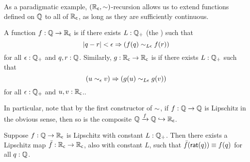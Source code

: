 As a paradigmatic example, $(\mathbb{R}_\mathsf{c},\mathord\sim)$-recursion allows us to extend functions defined on $\mathbb{Q}$ to all of $\mathbb{R}_\mathsf{c}$, as long as they are sufficiently continuous.

\begin{defn}\label{defn:lipschitz}
  A function $f:\mathbb{Q}\to\mathbb{R}_\mathsf{c}$ is  if there exists $L:\mathbb{Q}_{+}$ (the ) such that
  \[ |q - r|<\epsilon \Rightarrow (f(q) \sim_{L\epsilon} f(r)) \]
  for all $\epsilon:\mathbb{Q}_{+}$ and $q,r:\mathbb{Q}$.
  Similarly, $g:\mathbb{R}_\mathsf{c}\to\mathbb{R}_\mathsf{c}$ is  if there exists $L:\mathbb{Q}_{+}$ such that
  \[ (u\sim_{\epsilon} v) \Rightarrow (g(u) \sim_{L\epsilon} g(v)) \]
  for all $\epsilon:\mathbb{Q}_{+}$ and $u,v:\mathbb{R}_\mathsf{c}$..
\end{defn}

In particular, note that by the first constructor of $\mathord\sim$, if $f:\mathbb{Q}\to\mathbb{Q}$ is Lipschitz in the obvious sense, then so is the composite $\mathbb{Q}\xrightarrow{f} \mathbb{Q} \hookrightarrow \mathbb{R}_\mathsf{c}$.

\begin{lem}\label{RC-extend-Q-Lipschitz}
  Suppose $f : \mathbb{Q} \to \mathbb{R}_\mathsf{c}$ is Lipschitz with constant $L : \mathbb{Q}_{+}$.
  Then there exists a Lipschitz map $\bar{f} : \mathbb{R}_\mathsf{c} \to \mathbb{R}_\mathsf{c}$, also with constant $L$, such that $\bar{f}(\mathsf{rat}(q)) \equiv f(q)$ for all $q:\mathbb{Q}$.
\end{lem}

